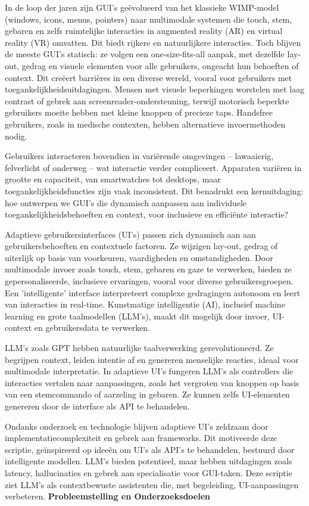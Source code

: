 \documentclass[openany]{book}
\begin{document}
In de loop der jaren zijn GUI's geëvolueerd van het klassieke WIMP-model (windows, icons, menus, pointers) naar multimodale systemen die touch, stem, gebaren en zelfs ruimtelijke interacties in augmented reality (AR) en virtual reality (VR) omvatten. Dit biedt rijkere en natuurlijkere interacties. Toch blijven de meeste GUI's statisch: ze volgen een one-size-fits-all aanpak, met dezelfde lay-out, gedrag en visuele elementen voor alle gebruikers, ongeacht hun behoeften of context. Dit creëert barrières in een diverse wereld, vooral voor gebruikers met toegankelijkheidsuitdagingen. Mensen met visuele beperkingen worstelen met laag contrast of gebrek aan screenreader-ondersteuning, terwijl motorisch beperkte gebruikers moeite hebben met kleine knoppen of precieze taps. Handsfree gebruikers, zoals in medische contexten, hebben alternatieve invoermethoden nodig.

Gebruikers interacteren bovendien in variërende omgevingen – lawaaierig, felverlicht of onderweg – wat interactie verder compliceert. Apparaten variëren in grootte en capaciteit, van smartwatches tot desktops, maar toegankelijkheidsfuncties zijn vaak inconsistent. Dit benadrukt een kernuitdaging: hoe ontwerpen we GUI's die dynamisch aanpassen aan individuele toegankelijkheidsbehoeften en context, voor inclusieve en efficiënte interactie?

Adaptieve gebruikersinterfaces (UI's) passen zich dynamisch aan aan gebruikersbehoeften en contextuele factoren. Ze wijzigen lay-out, gedrag of uiterlijk op basis van voorkeuren, vaardigheden en omstandigheden. Door multimodale invoer zoals touch, stem, gebaren en gaze te verwerken, bieden ze gepersonaliseerde, inclusieve ervaringen, vooral voor diverse gebruikersgroepen. Een 'intelligente' interface interpreteert complexe gedragingen autonoom en leert van interacties in real-time. Kunstmatige intelligentie (AI), inclusief machine learning en grote taalmodellen (LLM's), maakt dit mogelijk door invoer, UI-context en gebruikersdata te verwerken.

LLM's zoals GPT hebben natuurlijke taalverwerking gerevolutioneerd. Ze begrijpen context, leiden intentie af en genereren menselijke reacties, ideaal voor multimodale interpretatie. In adaptieve UI's fungeren LLM's als controllers die interacties vertalen naar aanpassingen, zoals het vergroten van knoppen op basis van een stemcommando of aarzeling in gebaren. Ze kunnen zelfs UI-elementen genereren door de interface als API te behandelen.

Ondanks onderzoek en technologie blijven adaptieve UI's zeldzaam door implementatiecomplexiteit en gebrek aan frameworks. Dit motiveerde deze scriptie, geïnspireerd op ideeën om UI's als API's te behandelen, bestuurd door intelligente modellen. LLM's bieden potentieel, maar hebben uitdagingen zoals latency, hallucinaties en gebrek aan specialisatie voor GUI-taken. Deze scriptie ziet LLM's als contextbewuste assistenten die, met begeleiding, UI-aanpassingen verbeteren.
\newpage
\textbf{Probleemstelling en Onderzoeksdoelen}
\end{document}
